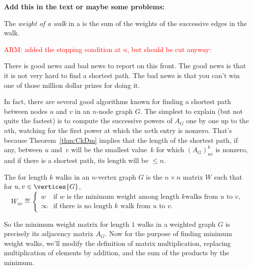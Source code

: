\begin{problems}
\homeworkproblems
{}
\end{problems}

\begin{editingnotes}
\textbf{Add this in the text or maybe some problems:}

\begin{definition}\label{def:5H}
  The \emph{weight of a walk}  in a  is the sum of the weights of
  the successive edges in the walk.
\end{definition}

\textcolor{red}{ARM: added the stopping condition at $n$, but should
  be cut anyway:}

There is good news and bad news to report on this front.  The good
news is that it is not very hard to find a shortest path.  The bad
news is that you can't win one of those million dollar prizes for
doing it.

In fact, there are several good algorithms known for finding a
shortest path between nodes $u$ and $v$ in an $n$-node graph $G$.  The
simplest to explain (but not quite the fastest) is to compute the
successive powers of $A_G$ one by one up to the $n$th, watching for
the first power at which the $uv$th entry is nonzero.  That's because
Theorem~\ref{thm:CkDm} implies that the length of the shortest path,
if any, between $u$ and~$v$ will be the smallest value~$k$ for which
$(A_G)_{uv}^k$ is nonzero, and if there is a shortest path, its length
will be $\leq n$.

\begin{definition}
  The  for length $k$ walks in an $n$-vertex
  graph $G$ is the $n \times n$ matrix $W$ such that for $u,v \in \vertices{G}$,
\begin{equation}\label{def:weight_matrix}
W_{uv} \eqdef
\begin{cases} w & \text{if $w$ is the minimum weight among length $k$
                            walks from $u$ to $v$},\\
              \infty & \text{if there is no length $k$ walk from $u$ to $v$}.
\end{cases}
\end{equation}
\end{definition}

So the minimum weight matrix for length $1$ walks in a weighted graph $G$
is precisely its adjacency matrix $A_G$.  Now for the purpose of finding
minimum weight walks, we'll modify the definition of matrix
multiplication, replacing multiplication of elements by addition, and the
sum of the products by the minimum.


\end{editingnotes}
